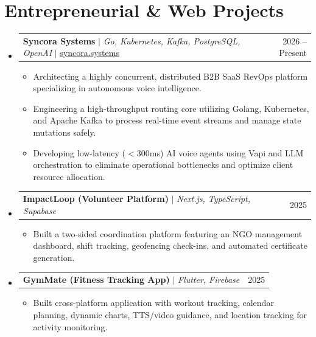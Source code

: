 \documentclass[11pt,letterpaper]{article}
\makeatletter
\newcommand{\resumeItem}[1]{\item\small{\color{MatteBlack}#1}}
\newcommand{\resumeProjectHeading}[2]{
    \vspace{-1pt}\item
    \begin{tabular*}{0.97\textwidth}{l@{\extracolsep{\fill}}r}
      \small#1 & \color{SlateGrey}#2 \\
    \end{tabular*}\vspace{-5pt}
}
\makeatother
\begin{document}
\section{Entrepreneurial \& Web Projects}
    \begin{itemize}[leftmargin=0.15in, label={}, itemsep=0pt, parsep=0pt]
      \resumeProjectHeading
          {\textbf{Syncora Systems} $|$ \emph{Go, Kubernetes, Kafka, PostgreSQL, OpenAI} $|$ \href{https://syncora.systems}{\color{DeepBlue}syncora.systems}}{2026 -- Present}
          \begin{itemize}[leftmargin=0.15in, label={$\bullet$}, itemsep=1pt, parsep=0pt]
            \resumeItem{Architecting a highly concurrent, distributed B2B SaaS RevOps platform specializing in autonomous voice intelligence.}
            \resumeItem{Engineering a high-throughput routing core utilizing Golang, Kubernetes, and Apache Kafka to process real-time event streams and manage state mutations safely.}
            \resumeItem{Developing low-latency ($<$300ms) AI voice agents using Vapi and LLM orchestration to eliminate operational bottlenecks and optimize client resource allocation.}
          \end{itemize}
          \vspace{3pt} 

      \resumeProjectHeading
          {\textbf{ImpactLoop (Volunteer Platform)} $|$ \emph{Next.js, TypeScript, Supabase}}{2025}
          \begin{itemize}[leftmargin=0.15in, label={$\bullet$}, itemsep=1pt, parsep=0pt]
            \resumeItem{Built a two-sided coordination platform featuring an NGO management dashboard, shift tracking, geofencing check-ins, and automated certificate generation.}
          \end{itemize}
          \vspace{3pt}
          
      \resumeProjectHeading
          {\textbf{GymMate (Fitness Tracking App)} $|$ \emph{Flutter, Firebase}}{2025}
          \begin{itemize}[leftmargin=0.15in, label={$\bullet$}, itemsep=1pt, parsep=0pt]
            \resumeItem{Built cross-platform application with workout tracking, calendar planning, dynamic charts, TTS/video guidance, and location tracking for activity monitoring.}
          \end{itemize}
    \end{itemize}

\end{document}
